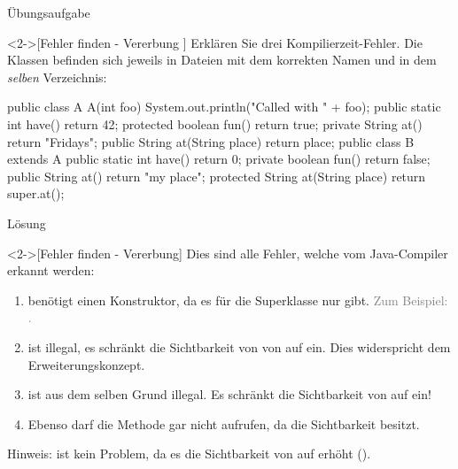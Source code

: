 \ifull
\begin{frame}[c,fragile]{Übungsaufgabe}
    \begin{exercise}<2->[Fehler finden - Vererbung ]
        \pause{}Erklären Sie drei Kompilierzeit-Fehler. Die Klassen befinden sich jeweils in Dateien mit dem korrekten Namen und in dem \emph{selben} Verzeichnis:\pause{}
%
\begin{plainjava}
public class A {
    A(int foo) { System.out.println("Called with " + foo); }
    public static int have() { return 42; }
    protected boolean fun() { return true; }
    private String at() { return "Fridays"; }
    public String at(String place) { return place; }
}
public class B extends A {
    public static int have() { return 0; }
    private boolean fun() { return false; }
    public String at() { return "my place"; }
    protected String at(String place) { return super.at(); }
}
\end{plainjava}
    \end{exercise}
\end{frame}

\begin{frame}[c,fragile]{Lösung}
    \begin{solve}<2->[Fehler finden - Vererbung]
        Dies sind alle Fehler, welche vom Java-Compiler erkannt werden:
        \begin{enumerate}[<+(1)->]
            \item {} benötigt einen Konstruktor, da es für die Superklasse nur  gibt.\pause{} \textcolor{gray}{Zum Beispiel: .}
            \item {} ist illegal, es schränkt die Sichtbarkeit von  von  auf  ein. Dies widerspricht dem Erweiterungskonzept.
            \item {} ist aus dem selben Grund illegal. Es schränkt die Sichtbarkeit von  auf  ein!
            \item Ebenso darf  die Methode  gar nicht aufrufen, da  die Sichtbarkeit  besitzt.
        \end{enumerate}
        Hinweis:  ist kein Problem, da es die Sichtbarkeit von  auf  erhöht ().
    \end{solve}
\end{frame}
\fi


